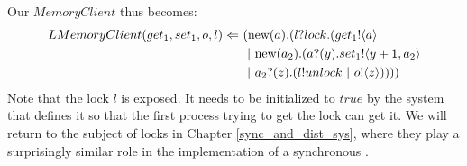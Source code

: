 Our $MemoryClient$ thus becomes:
\begin{equation}\begin{split}
	LMemoryClient(get_1,set_1,o,l)\Leftarrow\  & (\text{new}({a}).(l?lock.({get_1}!\langle{a}\rangle\\
	&\ |\  \text{new}({a_2}).({a}?({y}). {set_1}!\langle{y+1,a_2}\rangle\\
	&\ |\  {a_2}?({z}).(l!unlock\ |\  {o}!\langle{z}\rangle))))
\end{split}\end{equation}
Note that the lock $l$ is exposed.  
It needs to be initialized to $true$ by the system that defines it so that the first process trying to get the lock can get it.   
We will return to the subject of locks in Chapter \ref{sync_and_dist_sys}, where they play a surprisingly similar role in the implementation of a synchronous \picalc.